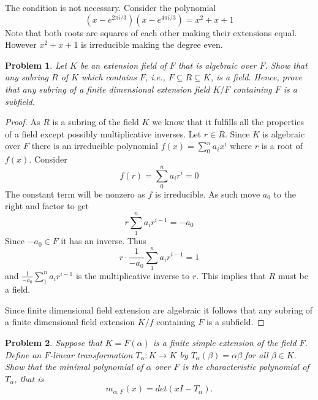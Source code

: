 \documentclass[10pt]{article}
\newcommand{\sk}{\vskip 10mm}
\theoremstyle{plain}
\newtheorem{problem}{Problem}
\theoremstyle{remark}
\begin{document}
The condition is not necessary. Consider the polynomial
\[(x-e^{2\pi i/3})(x-e^{4\pi i/3})=x^2+x+1\]
Note that both roots are squares of each other making their extensions equal.
However $x^2+x+1$ is irreducible making the degree even.

\sk

\begin{problem}{6}
  Let $K$ be an extension field of $F$ that is algebraic over $F$.
  Show that any subring $R$ of $K$ which contains $F$, i.e.,
  $F \subseteq R \subseteq K$, is a field. Hence, prove that any subring of
  a finite dimensional extension field $K/F$ containing $F$ is a subfield.
\end{problem}

\begin{proof}
  As $R$ is a subring of the field $K$ we know that it fulfills all the
  properties of a field except possibly multiplicative inverses. Let
  $r\in R$. Since $K$ is algebraic over $F$ there is an irreducible
  polynomial $f(x)=\sum_0^na_ix^i$ where $r$ is a root of $f(x)$. Consider
  \[f(r)=\sum_0^na_ir^i=0 \]
  The constant term will be nonzero as $f$ is irreducible. As such
  move $a_0$ to the right and factor to get
  \[r\sum_1^na_ir^{i-1} = -a_0\]
  Since $-a_0\in F$ it has an inverse. Thus
  \[r\cdot\frac{1}{-a_0}\sum_1^na_ir^{i-1}=1 \]
  and $\frac{1}{-a_0}\sum_1^na_ir^{i-1}$ is the multiplicative inverse to $r$.
  This implies that $R$ must be a field.

  Since finite dimensional field extension are algebraic it follows that any
  subring of a finite dimensional field extension $K/f$ containing $F$ is a
  subfield.
\end{proof}

\sk

\begin{problem}
  Suppose that $K = F(\alpha)$ is a finite simple extension of the field $F$.
  Define an $F$-linear transformation
  $T_\alpha: K \to K$ by $T_\alpha (\beta) = \alpha\beta$ for all $\beta \in K$.
  Show that the minimal polynomial of $\alpha$ over $F$ is the characteristic
  polynomial of $T_\alpha$, that is
  \begin{equation*}
    m_{\alpha, F}(x) = det(xI - T_\alpha).
  \end{equation*}
\end{problem}
\end{document}
